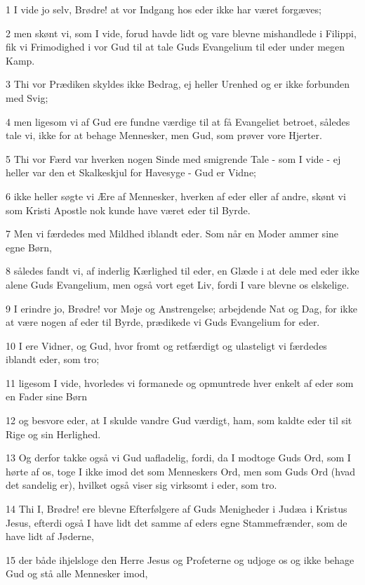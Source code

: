 \par 1 I vide jo selv, Brødre! at vor Indgang hos eder ikke har været forgæves;
\par 2 men skønt vi, som I vide, forud havde lidt og vare blevne mishandlede i Filippi, fik vi Frimodighed i vor Gud til at tale Guds Evangelium til eder under megen Kamp.
\par 3 Thi vor Prædiken skyldes ikke Bedrag, ej heller Urenhed og er ikke forbunden med Svig;
\par 4 men ligesom vi af Gud ere fundne værdige til at få Evangeliet betroet, således tale vi, ikke for at behage Mennesker, men Gud, som prøver vore Hjerter.
\par 5 Thi vor Færd var hverken nogen Sinde med smigrende Tale - som I vide - ej heller var den et Skalkeskjul for Havesyge - Gud er Vidne;
\par 6 ikke heller søgte vi Ære af Mennesker, hverken af eder eller af andre, skønt vi som Kristi Apostle nok kunde have været eder til Byrde.
\par 7 Men vi færdedes med Mildhed iblandt eder. Som når en Moder ammer sine egne Børn,
\par 8 således fandt vi, af inderlig Kærlighed til eder, en Glæde i at dele med eder ikke alene Guds Evangelium, men også vort eget Liv, fordi I vare blevne os elskelige.
\par 9 I erindre jo, Brødre! vor Møje og Anstrengelse; arbejdende Nat og Dag, for ikke at være nogen af eder til Byrde, prædikede vi Guds Evangelium for eder.
\par 10 I ere Vidner, og Gud, hvor fromt og retfærdigt og ulasteligt vi færdedes iblandt eder, som tro;
\par 11 ligesom I vide, hvorledes vi formanede og opmuntrede hver enkelt af eder som en Fader sine Børn
\par 12 og besvore eder, at I skulde vandre Gud værdigt, ham, som kaldte eder til sit Rige og sin Herlighed.
\par 13 Og derfor takke også vi Gud uafladelig, fordi, da I modtoge Guds Ord, som I hørte af os, toge I ikke imod det som Menneskers Ord, men som Guds Ord (hvad det sandelig er), hvilket også viser sig virksomt i eder, som tro.
\par 14 Thi I, Brødre! ere blevne Efterfølgere af Guds Menigheder i Judæa i Kristus Jesus, efterdi også I have lidt det samme af eders egne Stammefrænder, som de have lidt af Jøderne,
\par 15 der både ihjelsloge den Herre Jesus og Profeterne og udjoge os og ikke behage Gud og stå alle Mennesker imod,
